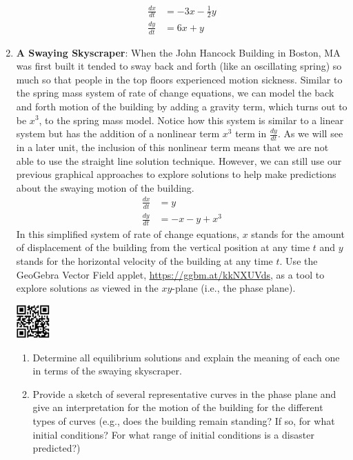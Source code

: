 \begin{enumerate}
\begin{align*}
\frac{dx}{dt}&= -3x-\frac{1}{2}y \\ \frac{dy}{dt}&= 6x+y
\end{align*}

\clearpage

\item \textbf{A Swaying Skyscraper}: When the John Hancock Building in Boston, MA was first built it tended to sway back and forth (like an oscillating spring) so much so that people in the top floors experienced motion sickness. Similar to the spring mass system of rate of change equations, we can model the back and forth motion of the building by adding a gravity term, which turns out to be $x^3$, to the spring mass model. Notice how this system is similar to a linear system but has the addition of a nonlinear term $x^3$ term in $\frac{dy}{dt}$. As we will see in a later unit, the inclusion of this nonlinear term means that we are not able to use the straight line solution technique. However, we can still use our previous graphical approaches to explore solutions to help make predictions about the swaying motion of the building.
\begin{align*}
\frac{dx}{dt}&= y \\
\frac{dy}{dt}&= -x-y+x^3
\end{align*}
In this simplified system of rate of change equations, $x$ stands for the amount of displacement of the building from the vertical position at any time $t$ and $y$ stands for the horizontal velocity of the building at any time $t$. Use the GeoGebra Vector Field applet, \href{https://ggbm.at/kkNXUVds}{\underline{https://ggbm.at/kkNXUVds}}, as a tool to explore solutions as viewed in the $xy$-plane (i.e., the phase plane). \label{10HWproblem8}

\vspace{-.5in}\hspace{-.6in}\includegraphics[width=0.5in]{10/10VectorFieldQR.png}

\begin{enumerate}
\item Determine all equilibrium solutions and explain the meaning of each one in terms of the swaying skyscraper.  \label{10HWproblem8parta}
 
\item Provide a sketch of several representative curves in the phase plane and give an interpretation for the motion of the building for the different types of curves (e.g., does the building remain standing? If so, for what initial conditions? For what range of initial conditions is a disaster predicted?) \label{10HWproblem8partb}
\end{enumerate}


\end{enumerate}
